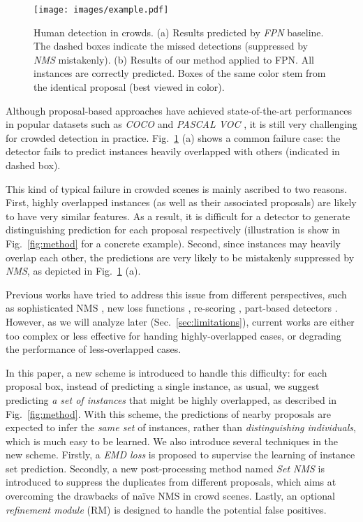 \documentclass[10pt,twocolumn,letterpaper]{article}
\begin{document}
\begin{figure}[!t]
\begin{center}
 \texttt{[image: images/example.pdf]}
\end{center}
   \caption{Human detection in crowds. (a) Results predicted by \emph{FPN} \cite{lin2017feature} baseline. The dashed boxes indicate the missed detections (suppressed by \emph{NMS} mistakenly). (b) Results of our method applied to FPN. All instances are correctly predicted. Boxes of the same color stem from the identical proposal (best viewed in color).   }
\label{fig:illustration}
\end{figure}

Although proposal-based approaches have achieved state-of-the-art performances \cite{he2017mask,cai2019cascadercnn,lin2017feature,lin2017focal} in popular datasets such as \emph{COCO} \cite{lin2014microsoft} and \emph{PASCAL VOC} \cite{pascalvoc}, it is still very challenging for crowded detection in practice. Fig.~\ref{fig:illustration} (a) shows a common failure case: the detector fails to predict instances heavily overlapped with others (indicated in dashed box). 

This kind of typical failure in crowded scenes is mainly ascribed to two reasons. First, highly overlapped instances (as well as their associated proposals) are likely to have very similar features. As a result, it is difficult for a detector to generate distinguishing prediction for each proposal respectively (illustration is show in Fig.~\ref{fig:method} for a concrete example). Second, since instances may heavily overlap each other, the predictions are very likely to be mistakenly suppressed by \emph{NMS}, as depicted in Fig.~\ref{fig:illustration} (a). 

Previous works have tried to address this issue from different perspectives, such as sophisticated NMS \cite{softnms,he2019bounding,adaptiveNMS,learningnms,sequentialcontext,hosang2016convnet}, new loss functions \cite{occludedattention,repulseloss}, re-scoring \cite{hu2017relation}, part-based detectors \cite{occludedattention,tian2015deep,Zhou_2018_ECCV,chi2019pedhunter}. However, as we will analyze later (Sec.~\ref{sec:limitations}), current works are either too complex or less effective for handing highly-overlapped cases, or degrading the performance of less-overlapped cases. 

In this paper, a new scheme is introduced to handle this difficulty: for each proposal box, instead of predicting a single instance, as usual, we suggest predicting \emph{a set of instances} that might be highly overlapped, as described in Fig.~\ref{fig:method}. With this scheme, the predictions of nearby proposals are expected to infer the \emph{same set} of instances, rather than \emph{distinguishing individuals}, which is much easy to be learned. We also introduce several techniques in the new scheme. Firstly, a \emph{EMD loss} is proposed to supervise the learning of instance set prediction. Secondly, a new post-processing method named \emph{Set NMS} is introduced to suppress the duplicates from different proposals, which aims at overcoming the drawbacks of na\" ive NMS in crowd scenes. Lastly, an optional \emph{refinement module} (RM) is designed to handle the potential false positives. 
\end{document}
